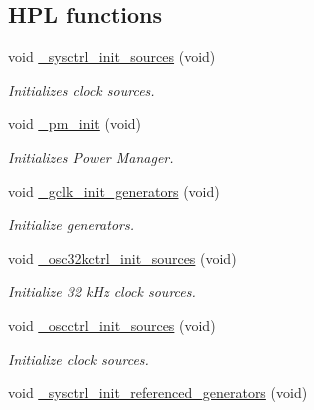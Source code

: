 \subsection*{H\+PL functions}
\begin{DoxyCompactItemize}
\item 
void \hyperlink{group___h_p_l_ga11bde7accfa853194b32dae4f27bad40}{\+\_\+sysctrl\+\_\+init\+\_\+sources} (void)
\begin{DoxyCompactList}\small\item\em Initializes clock sources. \end{DoxyCompactList}\item 
void \hyperlink{group___h_p_l_ga0e9b9fbf16506f0f6ad8e8b1aa87dc73}{\+\_\+pm\+\_\+init} (void)
\begin{DoxyCompactList}\small\item\em Initializes Power Manager. \end{DoxyCompactList}\item 
void \hyperlink{group___h_p_l_ga87e8c45b05aee8f3b453630134d3483d}{\+\_\+gclk\+\_\+init\+\_\+generators} (void)
\begin{DoxyCompactList}\small\item\em Initialize generators. \end{DoxyCompactList}\item 
\mbox{\label{group___h_p_l_gaab304aa890beb23e3311aaa2c0def527}} 
void \hyperlink{group___h_p_l_gaab304aa890beb23e3311aaa2c0def527}{\+\_\+osc32kctrl\+\_\+init\+\_\+sources} (void)
\begin{DoxyCompactList}\small\item\em Initialize 32 k\+Hz clock sources. \end{DoxyCompactList}\item 
\mbox{\label{group___h_p_l_gaee0105b1dbc07a2ca23586aa95f49cc7}} 
void \hyperlink{group___h_p_l_gaee0105b1dbc07a2ca23586aa95f49cc7}{\+\_\+oscctrl\+\_\+init\+\_\+sources} (void)
\begin{DoxyCompactList}\small\item\em Initialize clock sources. \end{DoxyCompactList}\item 
\mbox{\label{group___h_p_l_ga3e5e49081818470968093b6e3597ab5f}} 
void \hyperlink{group___h_p_l_ga3e5e49081818470968093b6e3597ab5f}{\+\_\+sysctrl\+\_\+init\+\_\+referenced\+\_\+generators} (void)

\end{DoxyCompactItemize}
